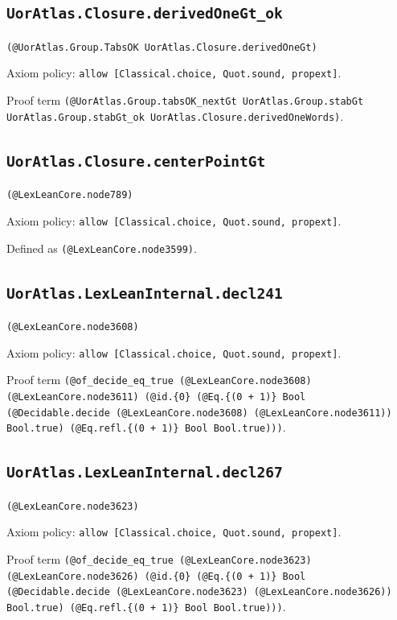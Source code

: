 \documentclass[11pt]{article}
\begin{document}
\subsection*{\texttt{UorAtlas.Closure.derivedOneGt\_ok}}
\noindent\texttt{(@UorAtlas.Group.TabsOK UorAtlas.Closure.derivedOneGt)}\par
\noindent Axiom policy: \texttt{allow [Classical.choice, Quot.sound, propext]}.\par
\noindent Proof term \texttt{(@UorAtlas.Group.tabsOK\_nextGt UorAtlas.Group.stabGt UorAtlas.Group.stabGt\_ok UorAtlas.Closure.derivedOneWords)}.\par
\subsection*{\texttt{UorAtlas.Closure.centerPointGt}}
\noindent\texttt{(@LexLeanCore.node789)}\par
\noindent Axiom policy: \texttt{allow [Classical.choice, Quot.sound, propext]}.\par
\noindent Defined as \texttt{(@LexLeanCore.node3599)}.\par
\subsection*{\texttt{UorAtlas.LexLeanInternal.decl241}}
\noindent\texttt{(@LexLeanCore.node3608)}\par
\noindent Axiom policy: \texttt{allow [Classical.choice, Quot.sound, propext]}.\par
\noindent Proof term \texttt{(@of\_decide\_eq\_true (@LexLeanCore.node3608) (@LexLeanCore.node3611) (@id.\{0\} (@Eq.\{(0 + 1)\} Bool (@Decidable.decide (@LexLeanCore.node3608) (@LexLeanCore.node3611)) Bool.true) (@Eq.refl.\{(0 + 1)\} Bool Bool.true)))}.\par
\subsection*{\texttt{UorAtlas.LexLeanInternal.decl267}}
\noindent\texttt{(@LexLeanCore.node3623)}\par
\noindent Axiom policy: \texttt{allow [Classical.choice, Quot.sound, propext]}.\par
\noindent Proof term \texttt{(@of\_decide\_eq\_true (@LexLeanCore.node3623) (@LexLeanCore.node3626) (@id.\{0\} (@Eq.\{(0 + 1)\} Bool (@Decidable.decide (@LexLeanCore.node3623) (@LexLeanCore.node3626)) Bool.true) (@Eq.refl.\{(0 + 1)\} Bool Bool.true)))}.\par
\end{document}
